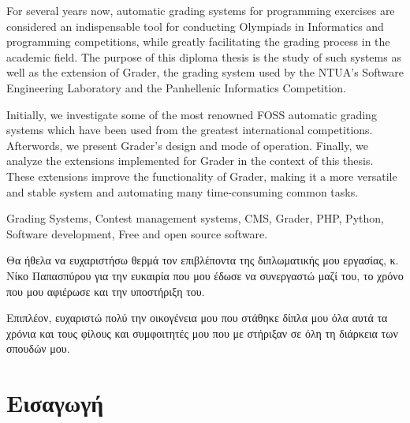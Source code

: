 \documentclass[diploma]{softlab-thesis}
\begin{document}

\begin{abstracten}%

  For several years now, automatic grading systems for programming exercises
  are considered an indispensable tool for conducting Olympiads in Informatics and
  programming competitions, while greatly facilitating the grading process in
  the academic field. The purpose of this diploma thesis is the study of such
  systems as well as the extension of Grader, the grading system used by the
  NTUA's Software Engineering Laboratory and the Panhellenic Informatics
  Competition.

  \bigskip

  Initially, we investigate some of the most renowned FOSS automatic grading
  systems which have been used from the greatest international competitions.
  Afterwords, we present Grader's design and mode of operation. Finally, we
  analyze the extensions implemented for Grader in the context of this thesis.
  These extensions improve the functionality of Grader, making it a more
  versatile and stable system and automating many time-consuming common tasks.


\begin{keywordsen}
Grading Systems, Contest management systems, CMS, Grader, PHP, Python,
Software development, Free and open source software.
\end{keywordsen}
\end{abstracten}



\begin{acknowledgementsgr}
  Θα ήθελα να ευχαριστήσω θερμά τον επιβλέποντα της διπλωματικής μου εργασίας,
  κ. Νίκο Παπασπύρου για την ευκαιρία που μου έδωσε να συνεργαστώ μαζί του,
  το χρόνο που μου αφιέρωσε και την υποστήριξη του.

  \bigskip

  Επιπλέον, ευχαριστώ πολύ την οικογένεια μου που στάθηκε δίπλα μου όλα αυτά
  τα χρόνια και τους φίλους και συμφοιτητές μου που με στήριξαν σε όλη τη
  διάρκεια των σπουδών μου.
\end{acknowledgementsgr}



\tableofcontents
\listoftables
\listoffigures



\mainmatter

\chapter{Εισαγωγή}
\end{document}
